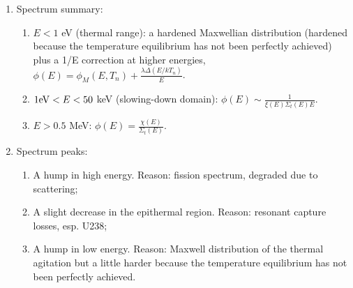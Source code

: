 \documentclass{school-22.211-notes}
\begin{document}
\begin{enumerate}
\item Spectrum summary:
  \begin{enumerate}
  \item $E < 1$ eV (thermal range): a hardened Maxwellian distribution (hardened because the temperature equilibrium has not been perfectly achieved) plus a 1/E correction at higher energies, $\phi(E) = \phi_M (E, T_n) + \frac{ \lambda \Delta (E/kT_n) }{E}$. 

  \item $1 \mathrm{eV} < E < 50$ keV (slowing-down domain): $\phi(E) \sim \frac{1}{\xi(E) \Sigma_t(E) E}$. 

  \item $E > 0.5$ MeV: $\phi(E) = \frac{\chi(E)}{\Sigma_t(E)}$.
  \end{enumerate}

\item Spectrum peaks:   
  \begin{enumerate}
  \item A hump in high energy. Reason: fission spectrum, degraded due to scattering; 
  \item A slight decrease in the epithermal region. Reason: resonant capture losses, esp. U238; 
  \item A hump in low energy. Reason: Maxwell distribution of the thermal agitation but a little harder because the temperature equilibrium has not been perfectly achieved. 
  \end{enumerate}
\end{enumerate}
\end{document}
